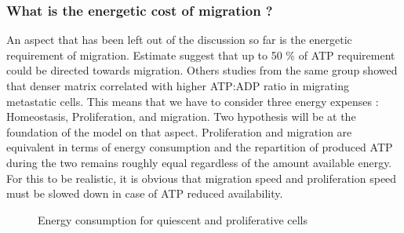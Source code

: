 \documentclass[11pt,a4paper]{article}
\begin{document}
\subsubsection{What is the energetic cost of migration ?}
An aspect that has been left out of the discussion so far is the energetic requirement of migration. Estimate suggest that up to 50 \% of ATP requirement could be directed towards migration.\cite{Zanotelli2021} Others studies from the same group showed that denser matrix correlated with higher ATP:ADP ratio in migrating metastatic cells. This means that we have to consider three energy expenses : Homeostasis, Proliferation, and migration. Two hypothesis will be at the foundation of the model on that aspect. Proliferation and migration are equivalent in terms of energy consumption and the repartition of produced ATP during the two remains roughly equal regardless of the amount available energy. For this to be realistic, it is obvious that migration speed and proliferation speed must be slowed down in case of ATP reduced availability.

\begin{figure}[ht!]
\vspace{1cm}
\hspace{4cm} 
\caption{Energy consumption for quiescent and proliferative cells \label{energy}}
\end{figure}
\end{document}
